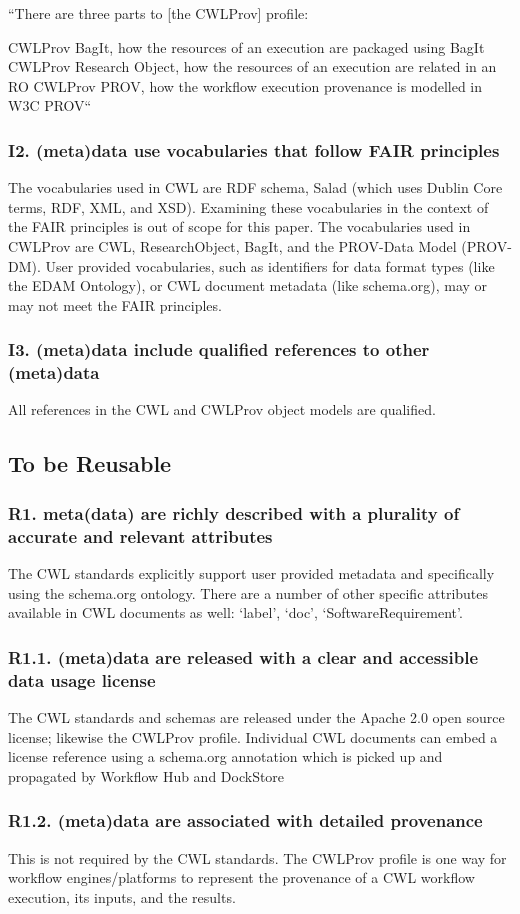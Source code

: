 “There are three parts to [the CWLProv] profile:

	CWLProv BagIt, how the resources of an execution are packaged using BagIt
	CWLProv Research Object, how the resources of an execution are related in an RO
	CWLProv PROV, how the workflow execution provenance is modelled in W3C PROV“
\subsubsection{I2. (meta)data use vocabularies that follow FAIR principles}
The vocabularies used in CWL are RDF schema, Salad (which uses Dublin Core terms, RDF, XML, and XSD). Examining these vocabularies in the context of the FAIR principles is out of scope for this paper. The vocabularies used in CWLProv are CWL, ResearchObject, BagIt, and the PROV-Data Model (PROV-DM). User provided vocabularies, such as identifiers for data format types (like the EDAM Ontology), or CWL document metadata (like schema.org), may or may not meet the FAIR principles.
\subsubsection{I3. (meta)data include qualified references to other (meta)data}
All references in the CWL and CWLProv object models are qualified.
\subsection{To be Reusable}
\subsubsection{R1. meta(data) are richly described with a plurality of accurate and relevant attributes}
The CWL standards explicitly support user provided metadata and specifically using the schema.org ontology. There are a number of other specific attributes available in CWL documents as well: ‘label’, ‘doc’, ‘SoftwareRequirement’.
\subsubsection{R1.1. (meta)data are released with a clear and accessible data usage license}
The CWL standards and schemas are released under the Apache 2.0 open source license; likewise the CWLProv profile. Individual CWL documents can embed a license reference using a schema.org annotation which is picked up and propagated by Workflow Hub and DockStore
\subsubsection{R1.2. (meta)data are associated with detailed provenance}
This is not required by the CWL standards. The CWLProv profile is one way for workflow engines/platforms to represent the provenance of a CWL workflow execution, its inputs, and the results.
